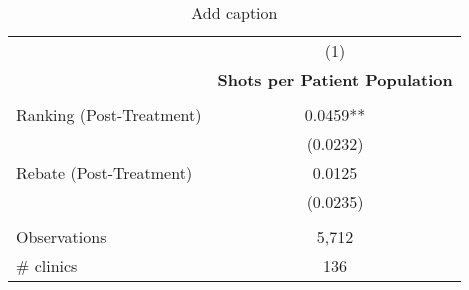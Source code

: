 \begin{table}[htbp]
  \centering
  \caption{Add caption}
    \begin{tabular}{lc}
          & (1) \\
          & \textbf{Shots per Patient Population} \\
          &  \\
    Ranking (Post-Treatment) & 0.0459** \\
          & (0.0232) \\
    Rebate (Post-Treatment) & 0.0125 \\
          & (0.0235) \\
          &  \\
    Observations & 5,712 \\
    \# clinics & 136 \\
    \end{tabular}%
  \label{tab:addlabel}%
\end{table}%
